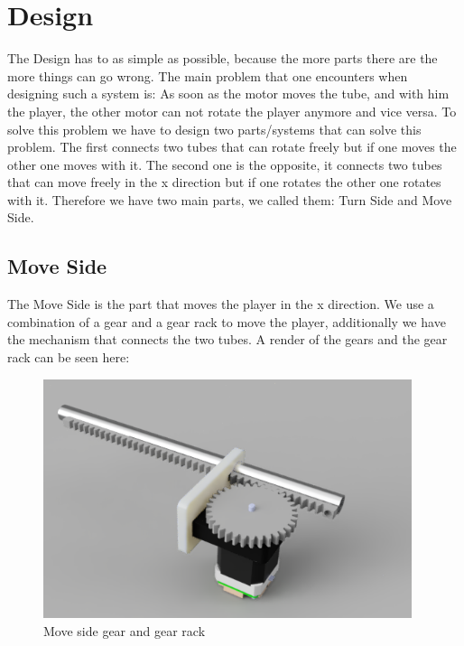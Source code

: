 \section{Design}\label{sec:design}
The Design has to as simple as possible, because the more parts there are the more things can go wrong.
The main problem that one encounters when designing such a system is:
As soon as the motor moves the tube, and with him the player, the other motor can not rotate the player anymore and vice versa.
To solve this problem we have to design two parts/systems that can solve this problem.
The first connects two tubes that can rotate freely but if one moves the other one moves with it.
The second one is the opposite, it connects two tubes that can move freely in the x direction but if one rotates the other one rotates with it.
Therefore we have two main parts, we called them: Turn Side and Move Side.
\subsection{Move Side}\label{subsec:move-side}
The Move Side is the part that moves the player in the x direction.
We use a combination of a gear and a gear rack to move the player, additionally we have the mechanism that connects the two tubes.
A render of the gears and the gear rack can be seen here:
\begin{figure}[H]
    \centering
    \includegraphics[height=7cm]{../photos/move_side_gear}
    \caption[moveside1]{Move side gear and gear rack}
    \label{fig:move_side_gear}
\end{figure}

